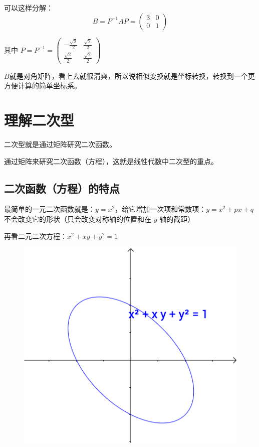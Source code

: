 \documentclass[12pt]{article}
\begin{document}
可以这样分解：
$$
B = P^{-1}AP = \begin{pmatrix}3&0\\0&1\end{pmatrix}
$$

其中 $P = P^{-1} = \begin{pmatrix}
-\frac{\sqrt{2}}{2}&\frac{\sqrt{2}}{2}\\
\frac{\sqrt{2}}{2}&\frac{\sqrt{2}}{2}
\end{pmatrix}$

$B$就是对角矩阵，看上去就很清爽，所以说相似变换就是坐标转换，转换到一个更方便计算的简单坐标系。

\section{理解二次型\cite{How_To_Understand_Quadratic_Form}}
二次型就是通过矩阵研究二次函数。

通过矩阵来研究二次函数（方程），这就是线性代数中二次型的重点。

\subsection{二次函数（方程）的特点}
最简单的一元二次函数就是：$y = x^2$，给它增加一次项和常数项：$y = x^2 + px + q$ 不会改变它的形状（只会改变对称轴的位置和在 $y$ 轴的截距）

再看二元二次方程：$x^2 + xy + y^2 = 1$
\begin{figure}[H]
    \centering
    \includegraphics[width=.8\textwidth]{fig/UnderstandQuadraticForm_1.png}
\end{figure} 
\end{document}
